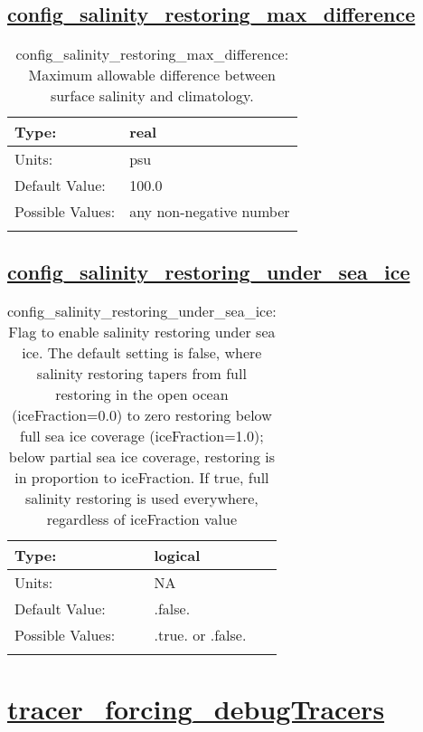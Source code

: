 \subsection[config\_salinity\_restoring\_max\_difference]{\hyperref[sec:nm_tab_tracer_forcing_activeTracers]{config\_salinity\_restoring\_max\_difference}}
\label{subsec:nm_sec_config_salinity_restoring_max_difference}
\begin{center}
\begin{longtable}{| p{2.0in} || p{4.0in} |}
    \hline
    Type: & real \\
    \hline
    Units: & \si{psu} \\
    \hline
    Default Value: & 100.0 \\
    \hline
    Possible Values: & any non-negative number \\
    \hline
    \caption{config\_salinity\_restoring\_max\_difference: Maximum allowable difference between surface salinity and climatology.}
\end{longtable}
\end{center}
\subsection[config\_salinity\_restoring\_under\_sea\_ice]{\hyperref[sec:nm_tab_tracer_forcing_activeTracers]{config\_salinity\_restoring\_under\_sea\_ice}}
\label{subsec:nm_sec_config_salinity_restoring_under_sea_ice}
\begin{center}
\begin{longtable}{| p{2.0in} || p{4.0in} |}
    \hline
    Type: & logical \\
    \hline
    Units: & \si{NA} \\
    \hline
    Default Value: & .false. \\
    \hline
    Possible Values: & .true. or .false. \\
    \hline
    \caption{config\_salinity\_restoring\_under\_sea\_ice: Flag to enable salinity restoring under sea ice.  The default setting is false, where salinity restoring tapers from full restoring in the open ocean (iceFraction=0.0) to zero restoring below full sea ice coverage (iceFraction=1.0); below partial sea ice coverage, restoring is in proportion to iceFraction.  If true, full salinity restoring is used everywhere, regardless of iceFraction value}
\end{longtable}
\end{center}
\section[tracer\_forcing\_debugTracers]{\hyperref[sec:nm_tab_tracer_forcing_debugTracers]{tracer\_forcing\_debugTracers}}
\label{sec:nm_sec_tracer_forcing_debugTracers}
